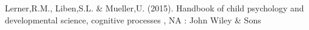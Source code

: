 Lerner,R.M., Liben,S.L. & Mueller,U. (2015). Handbook of child psychology and developmental science, cognitive processes , NA : John Wiley \& Sons
